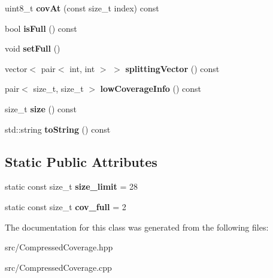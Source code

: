 \begin{DoxyCompactItemize}
\item 
\mbox{\label{classCompressedCoverage_a7b639ab500373bd777f6b75caa27abe4}} 
uint8\+\_\+t {\bfseries cov\+At} (const size\+\_\+t index) const
\item 
\mbox{\label{classCompressedCoverage_ac5491e9d51568d0c207a2c4d416ddfc3}} 
bool {\bfseries is\+Full} () const
\item 
\mbox{\label{classCompressedCoverage_ac9a2376e6c86031de88ed9337c0bb1c8}} 
void {\bfseries set\+Full} ()
\item 
\mbox{\label{classCompressedCoverage_ac1f11eeace2d52a0207a31f9a85a3369}} 
vector$<$ pair$<$ int, int $>$ $>$ {\bfseries splitting\+Vector} () const
\item 
\mbox{\label{classCompressedCoverage_a08cb62ffff592251c563c1674a3cc1d9}} 
pair$<$ size\+\_\+t, size\+\_\+t $>$ {\bfseries low\+Coverage\+Info} () const
\item 
\mbox{\label{classCompressedCoverage_a5514590a7981c2c0b43edf82cad22713}} 
size\+\_\+t {\bfseries size} () const
\item 
\mbox{\label{classCompressedCoverage_a0b7ec54fdf78d972404cbdb71862e15c}} 
std\+::string {\bfseries to\+String} () const
\end{DoxyCompactItemize}
\subsection*{Static Public Attributes}
\begin{DoxyCompactItemize}
\item 
\mbox{\label{classCompressedCoverage_ad324bf33950dd78f7c39f56a72400d87}} 
static const size\+\_\+t {\bfseries size\+\_\+limit} = 28
\item 
\mbox{\label{classCompressedCoverage_ac7942a1bb859362a4e3009f03a69ace2}} 
static const size\+\_\+t {\bfseries cov\+\_\+full} = 2
\end{DoxyCompactItemize}


The documentation for this class was generated from the following files\+:\begin{DoxyCompactItemize}
\item 
src/Compressed\+Coverage.\+hpp\item 
src/Compressed\+Coverage.\+cpp\end{DoxyCompactItemize}
